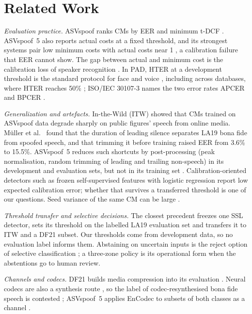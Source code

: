 \documentclass[journal]{IEEEtran}
\begin{document}
\section{Related Work}
\label{sec:related}
\emph{Evaluation practice.} ASVspoof ranks CMs by EER and minimum t-DCF \cite{wang20_asvspoof2019,liu23_asvspoof2021,
kinnunen18_tdcf}. ASVspoof~5 also reports actual costs at a fixed threshold, and its strongest systems pair low minimum
costs with actual costs near 1 \cite{wang24_asvspoof5}, a calibration failure that EER cannot show. The gap between actual
and minimum cost is the calibration loss of speaker recognition \cite{brummer06_calibration,vanleeuwen07_intro}. In PAD,
HTER at a development threshold is the standard protocol for face \cite{chingovska12_lbp} and voice
\cite{korshunov16_crossdb}, including across databases, where HTER reaches 50\% \cite{korshunov16_crossdb}; ISO/IEC 30107-3
names the two error rates APCER and BPCER \cite{iso30107_3}.

\emph{Generalization and artefacts.} In-the-Wild (ITW) \cite{muller22_in_the_wild} showed that CMs trained on ASVspoof data
degrade sharply on public figures' speech from online media. M\"uller et al.\ \cite{muller21_silence} found that the
duration of leading silence separates LA19 bona fide from spoofed speech, and that trimming it before training raised EER
from 3.6\% to 15.5\%. ASVspoof~5 reduces such shortcuts by post-processing (peak normalisation, random trimming of leading
and trailing non-speech) in its development and evaluation sets, but not in its training set \cite{wang25_asvspoof5_db}.
Calibration-oriented detectors such as frozen self-supervised features with logistic regression \cite{pascu24_calibrated}
report low expected calibration error; whether that survives a transferred threshold is one of our questions. Seed
variance of the same CM can be large \cite{wang21_comparative}.

\emph{Threshold transfer and selective decisions.} The closest precedent \cite{zhou26_eer_hides} freezes one SSL detector,
sets its threshold on the labelled LA19 evaluation set and transfers it to ITW and a DF21 subset. Our thresholds come from
development data, so no evaluation label informs them. Abstaining on uncertain inputs is the reject option of selective
classification \cite{geifman17_selective}; a three-zone policy is its operational form when the abstentions go to human
review.

\emph{Channels and codecs.} DF21 builds media compression into its evaluation \cite{liu23_asvspoof2021}. Neural codecs are
also a synthesis route \cite{wu24_codecfake}, so the label of codec-resynthesised bona fide speech is contested
\cite{xiao26_resynth}; ASVspoof~5 applies EnCodec to subsets of both classes as a channel \cite{wang25_asvspoof5_db}.
\end{document}

